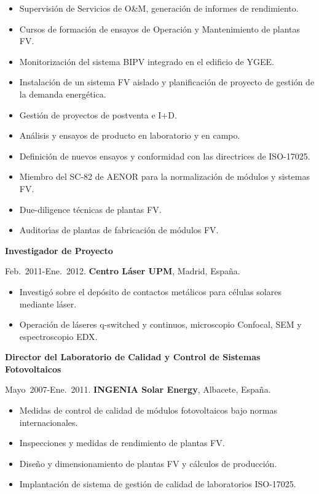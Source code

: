 \documentclass{article}
\begin{document}
\begin{itemize}\itemsep 0pt
\item Supervisi\'on de Servicios de O{\&}M, generaci\'on de informes de rendimiento.
\item Cursos de formaci\'on de ensayos de Operaci\'on y Mantenimiento de plantas FV.
\item Monitorizaci\'on del sistema BIPV integrado en el edificio de YGEE. 
\item Instalaci\'on de un sistema FV aislado y planificaci\'on de proyecto de gesti\'on de la demanda energ\'etica.
\item Gesti\'on de proyectos de postventa e I+D.
\item An\'alisis y ensayos de producto en laboratorio y en campo.
\item Definici\'on de nuevos ensayos y conformidad con las directrices de ISO-17025.
\item Miembro del SC-82 de AENOR para la normalizaci\'on de m\'odulos y sistemas FV.
\item Due-diligence t\'ecnicas de plantas FV.
\item Auditor\'{\i}as de plantas de fabricaci\'on de m\'odulos FV.
\end{itemize}


{\bf Investigador de Proyecto}

\medskip
Feb.~2011-Ene.~2012.
{\bf Centro L\'aser UPM},
Madrid, Espa\~na.

\begin{itemize}\itemsep 0pt
\item Investig\'o sobre el dep\'osito de contactos met\'alicos para c\'elulas solares mediante l\'aser.
\item Operaci\'on de l\'aseres q-switched y continuos, microscopio Confocal, SEM y espectroscopio EDX.
\end{itemize}

{\bf Director del Laboratorio de Calidad y Control de Sistemas Fotovoltaicos}

\medskip
Mayo~2007-Ene.~2011.
{\bf INGENIA Solar Energy},
Albacete, Espa\~na.

\begin{itemize}\itemsep 0pt
\item Medidas de control de calidad de m\'odulos fotovoltaicos bajo normas internacionales.
\item Inspecciones y medidas de rendimiento de plantas FV.
\item Dise\~no y dimensionamiento de plantas FV y c\'alculos de producci\'on.
\item Implantaci\'on de sistema de gesti\'on de calidad de laboratorios ISO-17025.
\end{itemize}
\end{document}
